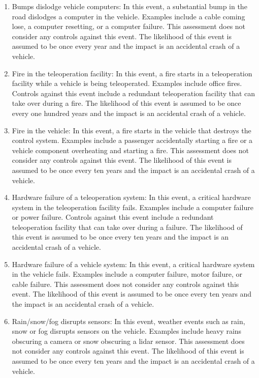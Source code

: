 \documentclass{article}
\begin{document}
\begin{enumerate}
\item Bumps dislodge vehicle computers: In this event, a substantial bump in the road dislodges a computer in the vehicle. Examples include a cable coming lose, a computer resetting, or a computer failure. This assessment does not consider any controls against this event. The likelihood of this event is assumed to be once every year and the impact is an accidental crash of a vehicle.
\item Fire in the teleoperation facility: In this event, a fire starts in a teleoperation facility while a vehicle is being teleoperated. Examples include office fires. Controls against this event include a redundant teleoperation facility that can take over during a fire. The likelihood of this event is assumed to be once every one hundred years and the impact is an accidental crash of a vehicle.
\item Fire in the vehicle: In this event, a fire starts in the vehicle that destroys the control system. Examples include a passenger accidentally starting a fire or a vehicle component overheating and starting a fire. This assessment does not consider any controls against this event. The likelihood of this event is assumed to be once every ten years and the impact is an accidental crash of a vehicle.
\item Hardware failure of a teleoperation system: In this event, a critical hardware system in the teleoperation facility fails. Examples include a computer failure or power failure. Controls against this event include a redundant teleoperation facility that can take over during a failure. The likelihood of this event is assumed to be once every ten years and the impact is an accidental crash of a vehicle.
\item Hardware failure of a vehicle system: In this event, a critical hardware system in the vehicle fails. Examples include a computer failure, motor failure, or cable failure. This assessment does not consider any controls against this event. The likelihood of this event is assumed to be once every ten years and the impact is an accidental crash of a vehicle.
\item Rain/snow/fog disrupts sensors: In this event, weather events such as rain, snow or fog disrupts sensors on the vehicle. Examples include heavy rains obscuring a camera or snow obscuring a lidar sensor. This assessment does not consider any controls against this event. The likelihood of this event is assumed to be once every ten years and the impact is an accidental crash of a vehicle.

\end{enumerate}
\end{document}
